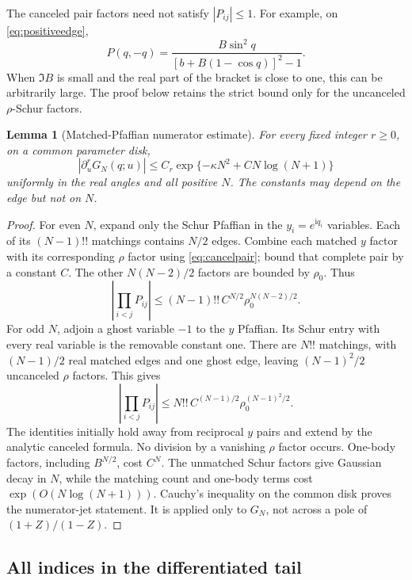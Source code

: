 \documentclass[11pt]{article}
\numberwithin{equation}{section}
\newtheorem{lemma}[theorem]{Lemma}
\theoremstyle{definition}
\newcommand{\ii}{\mathrm i}
\begin{document}
The canceled pair factors need not satisfy $|P_{ij}|\le1$. For example, on
\eqref{eq:positiveedge},
\[
 P(q,-q)=\frac{B\sin^2q}
               {[b+B(1-\cos q)]^2-1}.
\]
When $\Im B$ is small and the real part of the bracket is close to one,
this can be arbitrarily large. The proof below retains the strict bound
only for the uncanceled $\rho$-Schur factors.

\begin{lemma}[Matched-Pfaffian numerator estimate]\label{lem:matching}
For every fixed integer $r\ge0$, on a common parameter disk,
\[
 |\partial_u^rG_N(q;u)|
 \le C_r\exp\{-\kappa N^2+C N\log(N+1)\}
\]
uniformly in the real angles and all positive $N$. The constants may
depend on the edge but not on $N$.
\end{lemma}
\begin{proof}
For even $N$, expand only the Schur Pfaffian in the $y_i=e^{\ii q_i}$
variables. Each of its $(N-1)!!$ matchings contains $N/2$ edges. Combine
each matched $y$ factor with its corresponding $\rho$ factor using
\eqref{eq:cancelpair}; bound that complete pair by a constant $C$.
The other $N(N-2)/2$ factors are bounded by $\rho_0$. Thus
\[
 \left|\prod_{i<j}P_{ij}\right|
 \le (N-1)!!\,C^{N/2}\rho_0^{N(N-2)/2}.
\]
For odd $N$, adjoin a ghost variable $-1$ to the $y$ Pfaffian.
Its Schur entry with every real variable is the removable constant one.
There are $N!!$ matchings, with $(N-1)/2$ real matched edges and one
ghost edge, leaving $(N-1)^2/2$ uncanceled $\rho$ factors. This gives
\[
 \left|\prod_{i<j}P_{ij}\right|
 \le N!!\,C^{(N-1)/2}\rho_0^{(N-1)^2/2}.
\]
The identities initially hold away from reciprocal $y$ pairs and extend
by the analytic canceled formula. No division by a vanishing $\rho$
factor occurs. One-body factors, including $B^{N/2}$, cost $C^N$.
The unmatched Schur factors give Gaussian decay in $N$, while the
matching count and one-body terms cost $\exp(O(N\log(N+1)))$.
Cauchy's inequality on the common disk proves the numerator-jet
statement. It is applied only to $G_N$, not across a pole of
$(1+Z)/(1-Z)$.
\end{proof}

\subsection{All indices in the differentiated tail}
\end{document}
